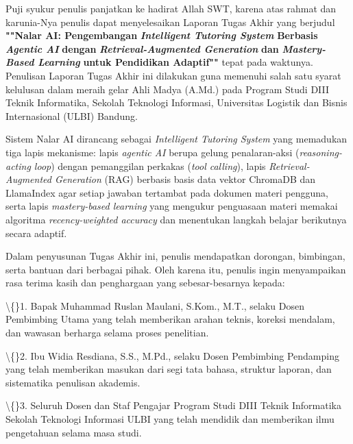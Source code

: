 \documentclass[12pt,a4paper]{article}
\begin{document}
Puji syukur penulis panjatkan ke hadirat Allah SWT, karena atas rahmat dan karunia-Nya penulis dapat menyelesaikan Laporan Tugas Akhir yang berjudul \textbf{""Nalar AI: Pengembangan} \textbf{\textit{Intelligent Tutoring System}} \textbf{Berbasis} \textbf{\textit{Agentic AI}} \textbf{dengan} \textbf{\textit{Retrieval-Augmented Generation}} \textbf{dan} \textbf{\textit{Mastery-Based Learning}} \textbf{untuk Pendidikan Adaptif""} tepat pada waktunya. Penulisan Laporan Tugas Akhir ini dilakukan guna memenuhi salah satu syarat kelulusan dalam meraih gelar Ahli Madya (A.Md.) pada Program Studi DIII Teknik Informatika, Sekolah Teknologi Informasi, Universitas Logistik dan Bisnis Internasional (ULBI) Bandung.



Sistem Nalar AI dirancang sebagai \textit{Intelligent Tutoring System} yang memadukan tiga lapis mekanisme: lapis \textit{agentic AI} berupa gelung penalaran-aksi (\textit{reasoning-acting loop}) dengan pemanggilan perkakas (\textit{tool calling}), lapis \textit{Retrieval-Augmented Generation} (RAG) berbasis basis data vektor ChromaDB dan LlamaIndex agar setiap jawaban tertambat pada dokumen materi pengguna, serta lapis \textit{mastery-based learning} yang mengukur penguasaan materi memakai algoritma \textit{recency-weighted accuracy} dan menentukan langkah belajar berikutnya secara adaptif.



Dalam penyusunan Tugas Akhir ini, penulis mendapatkan dorongan, bimbingan, serta bantuan dari berbagai pihak. Oleh karena itu, penulis ingin menyampaikan rasa terima kasih dan penghargaan yang sebesar-besarnya kepada:



\textbackslash\{\}1.	Bapak Muhammad Ruslan Maulani, S.Kom., M.T., selaku Dosen Pembimbing Utama yang telah memberikan arahan teknis, koreksi mendalam, dan wawasan berharga selama proses penelitian.



\textbackslash\{\}2.	Ibu Widia Resdiana, S.S., M.Pd., selaku Dosen Pembimbing Pendamping yang telah memberikan masukan dari segi tata bahasa, struktur laporan, dan sistematika penulisan akademis.



\textbackslash\{\}3.	Seluruh Dosen dan Staf Pengajar Program Studi DIII Teknik Informatika Sekolah Teknologi Informasi ULBI yang telah mendidik dan memberikan ilmu pengetahuan selama masa studi.
\end{document}

